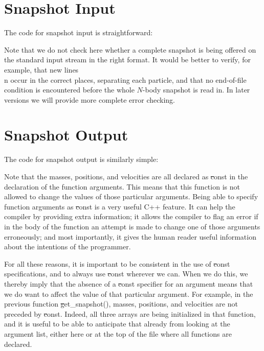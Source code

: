 \section{Snapshot Input}

The code for snapshot input is straightforward:


Note that we do not check here whether a complete snapshot is being
offered on the standard input stream in the right format.  It would be
better to verify, for example, that new lines {\st \\n} occur in the
correct places, separating each particle, and that no end-of-file
condition is encountered before the whole $N$-body snapshot is read in.
In later versions we will provide more complete error checking.

\section{Snapshot Output}

The code for snapshot output is similarly simple:


Note that the masses, positions, and velocities are all declared as
{\st const} in the declaration of the function arguments.  This means
that this function is not allowed to change the values of those
particular arguments.  Being able to specify function arguments as
{\st const} is a very useful C++ feature.  It can help the compiler by
providing extra information; it allows the compiler to flag an error
if in the body of the function an attempt is made to change one of
those arguments erroneously; and most importantly, it gives the human
reader useful information about the intentions of the programmer.

For all these reasons, it is important to be consistent in the use of
{\st const} specifications, and to always use {\st const} wherever we
can.  When we do this, we thereby imply that the absence of a {\st const}
specifier for an argument means that we do want to affect the value of
that particular argument.  For example, in the previous function 
{\st get\_snapshot()}, masses, positions, and velocities are not
preceded by {\st const}.  Indeed, all three arrays are being initialized
in that function, and it is useful to be able to anticipate that already
from looking at the argument list, either here or at the top of the
file where all functions are declared.

